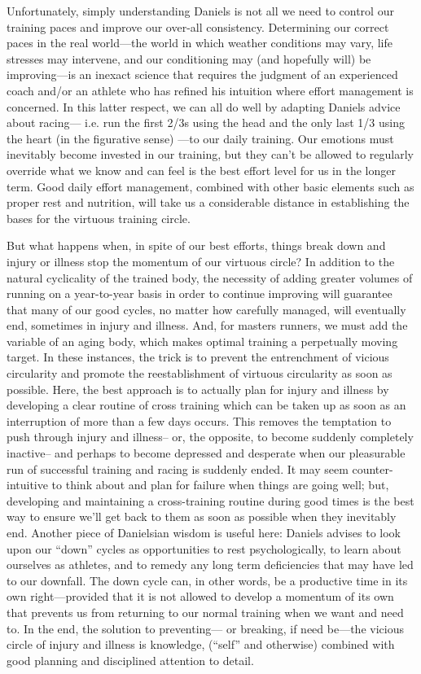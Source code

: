 Unfortunately, simply understanding Daniels is not all we need to control our training paces and improve our over-all consistency. Determining our correct paces in the real world—the world in which weather conditions may vary, life stresses may intervene, and our conditioning may (and hopefully will) be improving—is an inexact science that requires the judgment of an experienced coach and/or an athlete who has refined his intuition where effort management is concerned. In this latter respect, we can all do well by adapting Daniels advice about racing— i.e. run the first 2/3s using the head and the only last 1/3 using the heart (in the figurative sense) —to our daily training. Our emotions must inevitably become invested in our training, but they can’t be allowed to regularly override what we know and can feel is the best effort level for us in the longer term. Good daily effort management, combined with other basic elements such as proper rest and nutrition, will take us a considerable distance in establishing the bases for the virtuous training circle.

But what happens when, in spite of our best efforts, things break down and injury or illness stop the momentum of our virtuous circle? In addition to the natural cyclicality of the trained body, the necessity of adding greater volumes of running on a year-to-year basis in order to continue improving will guarantee that many of our good cycles, no matter how carefully managed, will eventually end, sometimes in injury and illness. And, for masters runners, we must add the variable of an aging body, which makes optimal training a perpetually moving target. In these instances, the trick is to prevent the entrenchment of vicious circularity and promote the reestablishment of virtuous circularity as soon as possible. Here, the best approach is to actually plan for injury and illness by developing a clear routine of cross training which can be taken up as soon as an interruption of more than a few days occurs. This removes the temptation to push through injury and illness-- or, the opposite, to become suddenly completely inactive-- and perhaps to become depressed and desperate when our pleasurable run of successful training and racing is suddenly ended. It may seem counter-intuitive to think about and plan for failure when things are going well; but, developing and maintaining a cross-training routine during good times is the best way to ensure we’ll get back to them as soon as possible when they inevitably end. Another piece of Danielsian wisdom is useful here: Daniels advises to look upon our “down” cycles as opportunities to rest psychologically, to learn about ourselves as athletes, and to remedy any long term deficiencies that may have led to our downfall. The down cycle can, in other words, be a productive time in its own right—provided that it is not allowed to develop a momentum of its own that prevents us from returning to our normal training when we want and need to. In the end, the solution to preventing— or breaking, if need be—the vicious circle of injury and illness is knowledge, (“self” and otherwise) combined with good planning and disciplined attention to detail.

